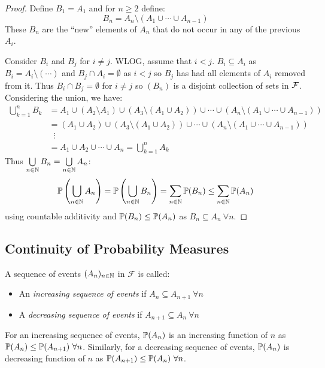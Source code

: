 \documentclass[../main.tex]{subfiles}
\begin{document}
\begin{proof}
  Define $B_1 = A_1$ and for $n \geq 2$ define:
  \[
    B_n = A_n \setminus (A_1 \cup \cdots \cup A_{n - 1})
  \]
  These $B_n$ are the ``new'' elements of $A_n$ that do not occur in any of the previous $A_i$.

  Consider $B_i$ and $B_j$ for $i \neq j$.
  WLOG, assume that $i < j$.
  $B_i \subseteq A_i$ as $B_i = A_i \setminus (\cdots)$ and $B_j \cap A_i = \emptyset$ as $i < j$ so $B_j$ has had all elements of $A_i$ removed from it.
  Thus $B_i \cap B_j = \emptyset$ for $i \neq j$ so $(B_n)$ is a disjoint collection of sets in $\salg$.
  Considering the union, we have:
  \begin{align*}
    \bigcup_{k = 1}^{n} B_k &= A_1 \cup (A_2 \setminus A_1) \cup (A_3 \setminus (A_1 \cup A_2)) \cup \cdots \cup( A_n \setminus (A_1 \cup \cdots \cup A_{n - 1})) \\
                            &= (A_1 \cup A_2) \cup (A_3 \setminus (A_1 \cup A_2)) \cup \cdots \cup (A_n \setminus (A_1 \cup \cdots \cup A_{n - 1})) \\
                            &\;\;\vdots \\
                            &= A_1 \cup A_2 \cup \cdots \cup A_n = \bigcup_{k = 1}^{n} A_k
  \end{align*}
  Thus $\bigcup\limits_{n \in \N} B_n = \bigcup\limits_{n \in \N} A_n$:
  \[
    \P\left(\bigcup_{n \in \N} A_n\right) = \P\left(\bigcup_{n \in \N} B_n\right) = \sum_{n \in \N} \P(B_n) \leq \sum_{n \in \N} \P(A_n)
  \]
  using countable additivity and $\P(B_n) \leq \P(A_n)$ as $B_n \subseteq A_n\ \forall n$.
\end{proof}
\subsection{Continuity of Probability Measures}
\label{continuityProbMeasures}
\begin{definition}
  A sequence of events $(A_n)_{n \in \N}$ in $\mathcal{F}$ is called:
  \begin{itemize}
    \item An \textit{increasing sequence of events} if $A_n \subseteq A_{n + 1}\ \forall n$
    \item A \textit{decreasing sequence of events} if $A_{n + 1} \subseteq A_n\ \forall n$
  \end{itemize}
\end{definition}
For an increasing sequence of events, $\P(A_n)$ is an increasing function of $n$ as $\P(A_n) \leq \P(A_{n + 1})\ \forall n$.
Similarly, for a decreasing sequence of events, $\P(A_n)$ is decreasing function of $n$ as $\P(A_{n + 1}) \leq \P(A_n)\ \forall n$.
\end{document}
